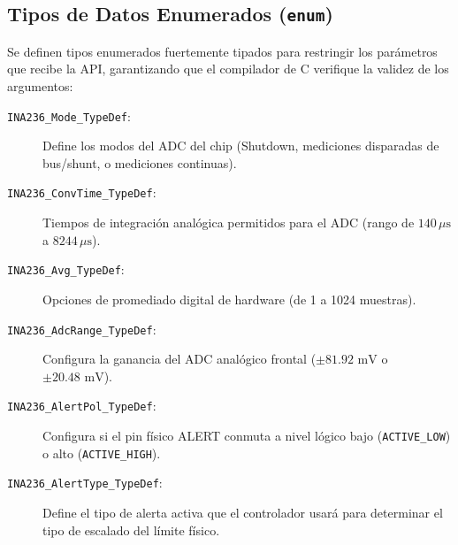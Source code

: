 \documentclass[
10pt, %
a4paper, %
oneside, %
headinclude,footinclude, %
BCOR5mm, %
]{scrartcl}
\begin{document}
\subsection{Tipos de Datos Enumerados (\texttt{enum})}
Se definen tipos enumerados fuertemente tipados para restringir los parámetros que recibe la API, garantizando que el compilador de C verifique la validez de los argumentos:
\begin{description}
	\item[\texttt{INA236\_Mode\_TypeDef}:] Define los modos del ADC del chip (Shutdown, mediciones disparadas de bus/shunt, o mediciones continuas).
	\item[\texttt{INA236\_ConvTime\_TypeDef}:] Tiempos de integración analógica permitidos para el ADC (rango de $140\,\mu\text{s}$ a $8244\,\mu\text{s}$).
	\item[\texttt{INA236\_Avg\_TypeDef}:] Opciones de promediado digital de hardware (de 1 a 1024 muestras).
	\item[\texttt{INA236\_AdcRange\_TypeDef}:] Configura la ganancia del ADC analógico frontal ($\pm 81.92\text{ mV}$ o $\pm 20.48\text{ mV}$).
	\item[\texttt{INA236\_AlertPol\_TypeDef}:] Configura si el pin físico ALERT conmuta a nivel lógico bajo (\texttt{ACTIVE\_LOW}) o alto (\texttt{ACTIVE\_HIGH}).
	\item[\texttt{INA236\_AlertType\_TypeDef}:] Define el tipo de alerta activa que el controlador usará para determinar el tipo de escalado del límite físico.
\end{description}
\end{document}
